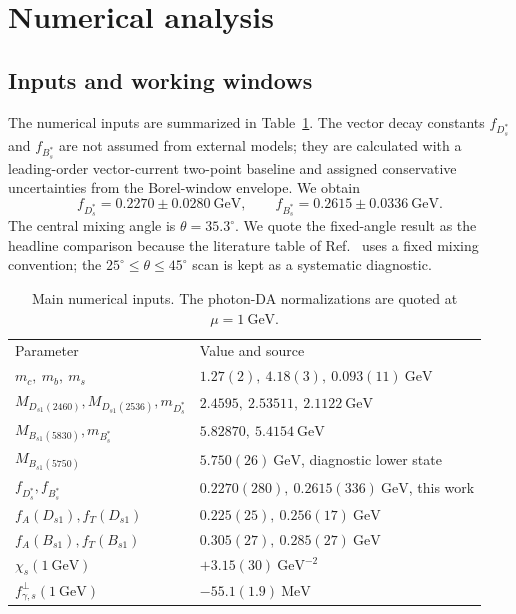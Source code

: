 \documentclass[aps,prd,a4paper,preprint,preprintnumbers,titlepage,
nofootinbib,superscriptaddress]{revtex4-2}
\newcommand{\Dst}{D_s^\ast}
\newcommand{\Dsone}{D_{s1}}
\newcommand{\Bst}{B_s^\ast}
\newcommand{\Bsone}{B_{s1}}
\newcommand{\GeV}{\mathrm{GeV}}
\newcommand{\MeV}{\mathrm{MeV}}
\newcommand{\fgammas}{f_{\gamma,s}^{\perp}}
\begin{document}
\section{Numerical analysis}
\label{sec:numerics}

\subsection{Inputs and working windows}
\label{subsec:inputs}

The numerical inputs are summarized in Table~\ref{tab:inputs}.  The vector
decay constants \(f_{\Dst}\) and \(f_{\Bst}\) are not assumed from external
models; they are calculated with a leading-order vector-current two-point
baseline and assigned conservative uncertainties from the Borel-window
envelope.  We obtain
\[
  f_{\Dst}=0.2270\pm0.0280~\GeV,\qquad
  f_{\Bst}=0.2615\pm0.0336~\GeV .
\]
The central mixing angle is \(\theta=35.3^\circ\).  We quote the fixed-angle
result as the headline comparison because the literature table of
Ref.~\cite{Bondar:2025smw} uses a fixed mixing convention; the
\(25^\circ\le\theta\le45^\circ\) scan is kept as a systematic diagnostic.

\begin{table}[t]
\centering
\caption{Main numerical inputs.  The photon-DA normalizations are quoted at
\(\mu=1~\GeV\).}
\label{tab:inputs}
\begin{ruledtabular}
\begin{tabular}{ll}
Parameter & Value and source\\
\colrule
\(m_c,\ m_b,\ m_s\) &
\(1.27(2),\ 4.18(3),\ 0.093(11)~\GeV\)
\cite{ParticleDataGroup:2024cfk}\\
\(M_{\Dsone(2460)},M_{\Dsone(2536)},m_{\Dst}\) &
\(2.4595,\ 2.53511,\ 2.1122~\GeV\)
\cite{ParticleDataGroup:2024cfk}\\
\(M_{\Bsone(5830)},m_{\Bst}\) &
\(5.82870,\ 5.4154~\GeV\)
\cite{ParticleDataGroup:2024cfk,CMS:2018qdl}\\
\(M_{B_{s1}(5750)}\) &
\(5.750(26)~\GeV\), diagnostic lower state\\
\(f_{\Dst}, f_{\Bst}\) &
\(0.2270(280),\ 0.2615(336)~\GeV\), this work\\
\(f_A(\Dsone), f_T(\Dsone)\) &
\(0.225(25),\ 0.256(17)~\GeV\)\\
\(f_A(B_{s1}), f_T(B_{s1})\) &
\(0.305(27),\ 0.285(27)~\GeV\) \cite{Pullin:2021ebn}\\
\(\chi_s(1~\GeV)\) &
\(+3.15(30)~\GeV^{-2}\) \cite{Rohrwild:2007yt}\\
\(\fgammas(1~\GeV)\) &
\(-55.1(1.9)~\MeV\) \cite{Bacchio:2024pij}\\
\end{tabular}
\end{ruledtabular}
\end{table}
\end{document}
